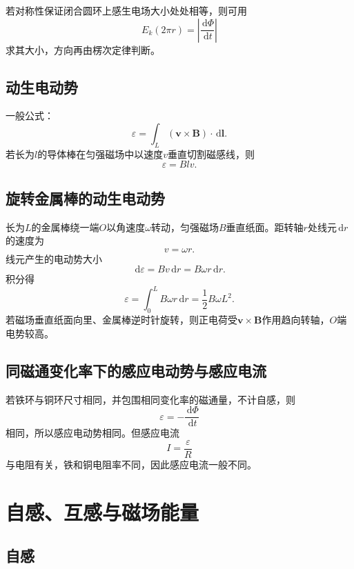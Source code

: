 \documentclass[UTF8,zihao=-4]{ctexart}
\newcommand{\dd}{\,\mathrm d}
\newcommand{\eps}{\varepsilon}
\newcommand{\ve}[1]{\bm{#1}}
\newcommand{\B}{\ve B}
\newcommand{\dl}{\dd\ve l}
\begin{document}
若对称性保证闭合圆环上感生电场大小处处相等，则可用
\[
E_k(2\pi r)=\left|\frac{\dd\Phi}{\dd t}\right|
\]
求其大小，方向再由楞次定律判断。

\subsection{动生电动势}

一般公式：
\begin{equation}
\boxed{\eps=\int_L(\ve v\times\B)\cdot\dl}.
\end{equation}
若长为\(l\)的导体棒在匀强磁场中以速度\(v\)垂直切割磁感线，则
\begin{equation}
\boxed{\eps=Blv}.
\end{equation}

\subsection{旋转金属棒的动生电动势}

长为\(L\)的金属棒绕一端\(O\)以角速度\(\omega\)转动，匀强磁场\(B\)垂直纸面。距转轴\(r\)处线元\(\dd r\)的速度为
\[
 v=\omega r.
\]
线元产生的电动势大小
\[
 \dd\eps=Bv\dd r=B\omega r\dd r.
\]
积分得
\begin{equation}
\boxed{\eps=\int_0^L B\omega r\dd r=\frac12 B\omega L^2}.
\end{equation}
若磁场垂直纸面向里、金属棒逆时针旋转，则正电荷受\(\ve v\times\B\)作用趋向转轴，\(O\)端电势较高。

\subsection{同磁通变化率下的感应电动势与感应电流}

若铁环与铜环尺寸相同，并包围相同变化率的磁通量，不计自感，则
\begin{equation}
\eps=-\frac{\dd\Phi}{\dd t}
\end{equation}
相同，所以感应电动势相同。但感应电流
\begin{equation}
I=\frac{\eps}{R}
\end{equation}
与电阻有关，铁和铜电阻率不同，因此感应电流一般不同。

\section{自感、互感与磁场能量}

\subsection{自感}
\end{document}
